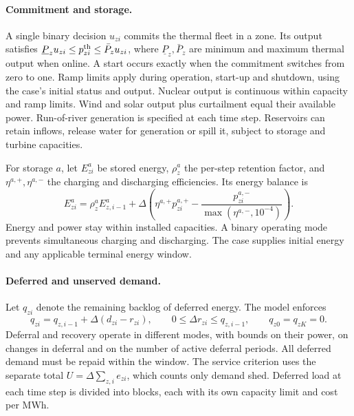 \documentclass[11pt,a4paper]{article}
\begin{document}
\paragraph{Commitment and storage.}
A single binary decision \(u_{zi}\) commits the thermal fleet in a zone. Its output satisfies \(\underline P_z u_{zi}\leq p^{\rm th}_{zi}\leq\bar P_z u_{zi}\), where \(\underline P_z,\bar P_z\) are minimum and maximum thermal output when online. A start occurs exactly when the commitment switches from zero to one. Ramp limits apply during operation, start-up and shutdown, using the case's initial status and output. Nuclear output is continuous within capacity and ramp limits. Wind and solar output plus curtailment equal their available power. Run-of-river generation is specified at each time step. Reservoirs can retain inflows, release water for generation or spill it, subject to storage and turbine capacities.

For storage \(a\), let \(E_{zi}^a\) be stored energy, \(\rho_z^a\) the per-step retention factor, and \(\eta^{a,+},\eta^{a,-}\) the charging and discharging efficiencies. Its energy balance is
\begin{equation}
 E_{zi}^a=\rho_z^a E_{z,i-1}^a
 +\Delta\left(\eta^{a,+}p_{zi}^{a,+}
            -\frac{p_{zi}^{a,-}}{\max(\eta^{a,-},10^{-4})}\right).
 \label{eq:dispatch-storage}
\end{equation}
Energy and power stay within installed capacities. A binary operating mode prevents simultaneous charging and discharging. The case supplies initial energy and any applicable terminal energy window.

\paragraph{Deferred and unserved demand.}
Let \(q_{zi}\) denote the remaining backlog of deferred energy. The model enforces
\begin{equation}
 q_{zi}=q_{z,i-1}+\Delta(d_{zi}-r_{zi}),\qquad
 0\leq\Delta r_{zi}\leq q_{z,i-1},\qquad q_{z0}=q_{zK}=0 .
 \label{eq:dispatch-backlog}
\end{equation}
Deferral and recovery operate in different modes, with bounds on their power, on changes in deferral and on the number of active deferral periods. All deferred demand must be repaid within the window. The service criterion uses the separate total \(U=\Delta\sum_{z,i}e_{zi}\), which counts only demand shed. Deferred load at each time step is divided into blocks, each with its own capacity limit and cost per MWh.
\end{document}
